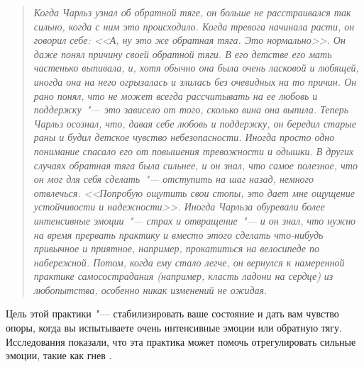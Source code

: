 \begin{quotation}
	\textit{Когда Чарльз узнал об обратной тяге, он больше не расстраивался так сильно, когда с ним это происходило. Когда тревога начинала расти, он говорил себе: <<А, ну это же обратная тяга. Это нормально>>. Он даже понял причину своей обратной тяги. В его детстве его мать частенько выпивала, и, хотя обычно она была очень ласковой и любящей, иногда она на него огрызалась и злилась без очевидных на то причин. Он рано понял, что не может всегда рассчитывать на ее любовь и поддержку~"--- это зависело от того, сколько вина она выпила. Теперь Чарльз осознал, что, давая себе любовь и поддержку, он бередил старые раны и будил детское чувство небезопасности. Иногда просто одно понимание спасало его от повышения тревожности и одышки. В других случаях обратная тяга была сильнее, и он знал, что самое полезное, что он мог для себя сделать~"--- отступить на шаг назад, немного отвлечься. <<Попробую ощутить свои стопы, это дает мне ощущение устойчивости и надежности>>. Иногда Чарльза обуревали более интенсивные эмоции~"--- страх и отвращение~"--- и он знал, что нужно на время прервать практику и вместо этого сделать что-нибудь привычное и приятное, например, прокатиться на велосипеде по набережной. Потом, когда ему стало легче, он вернулся к намеренной практике самосострадания (например, класть ладони на сердце) из любопытства, особенно никак изменений не ожидая.}
\end{quotation}

\newpage
{}\label{IP:Feeling_the_Soles_of_Your_Feet}

Цель этой практики~"--- стабилизировать ваше состояние и дать вам чувство опоры, когда вы испытываете очень интенсивные эмоции или обратную тягу. Исследования показали, что эта практика может помочь отрегулировать сильные эмоции, такие как гнев \cite{64}.

